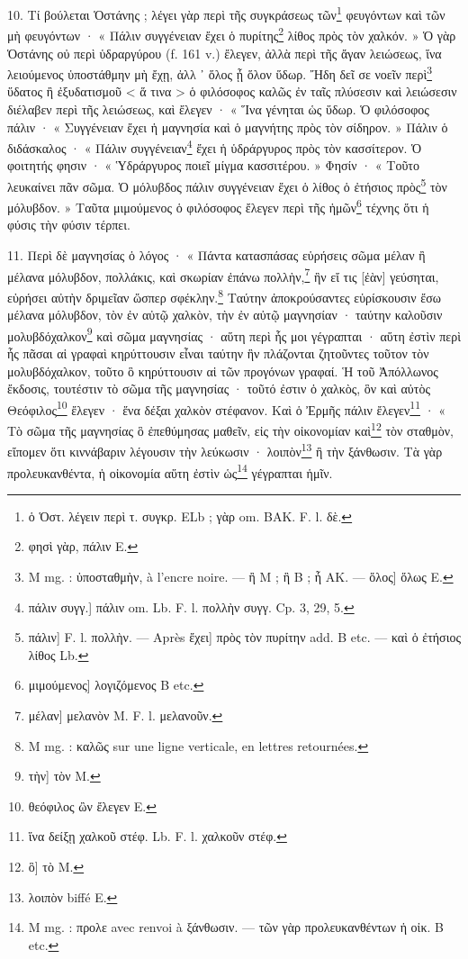 \documentclass[a4paper, 11pt, oneside, polutonikogreek, french]{article}
\begin{document}
10. Τί βούλεται Ὁστάνης ; λέγει γὰρ περὶ τῆς συγκράσεως τῶν\footnote{ὁ Ὁστ. λέγειν περὶ τ. συγκρ. ELb ; γὰρ om. BAK. F. l. δὲ.} φευγόντων καὶ τῶν μὴ φευγόντων · « Πάλιν συγγένειαν ἔχει ὁ πυρίτης\footnote{φησὶ γὰρ, πάλιν E.} λίθος πρὸς τὸν χαλκόν. » Ὁ γὰρ Ὁστάνης οὐ περὶ ὑδραργύρου (f. 161 v.) ἔλεγεν, ἀλλὰ περὶ τῆς ἄγαν λειώσεως, ἵνα λειούμενος ὑποστάθμην μὴ ἔχῃ, ἀλλ ᾽ ὅλος ᾖ ὅλον ὕδωρ. Ἤδη δεῖ σε νοεῖν περὶ\footnote{M mg. : ὑποσταθμὴν, à l'encre noire. --- ἢ M ; ἣ B ; ἦ AK. --- ὅλος] ὅλως E.} ὕδατος ἢ ἐξυδατισμοῦ < ἅ τινα > ὁ φιλόσοφος καλῶς ἐν ταῖς πλύσεσιν καὶ λειώσεσιν διέλαβεν περὶ τῆς λειώσεως, καὶ ἔλεγεν · « Ἵνα γένηται ὡς ὕδωρ. Ὁ φιλόσοφος πάλιν · « Συγγένειαν ἔχει ἡ μαγνησία καὶ ὁ μαγνήτης πρὸς τὸν σίδηρον. » Πάλιν ὁ διδάσκαλος · « Πάλιν συγγένειαν\footnote{πάλιν συγγ.] πάλιν om. Lb. F. l. πολλὴν συγγ. Cp. 3, 29, 5.} ἔχει ἡ ὑδράργυρος πρὸς τὸν κασσίτερον. Ὁ φοιτητής φησιν · « Ὑδράργυρος ποιεῖ μίγμα κασσιτέρου. » Φησίν · « Τοῦτο λευκαίνει πᾶν σῶμα. Ὁ μόλυβδος πάλιν συγγένειαν ἔχει ὁ λίθος ὁ ἐτήσιος πρὸς\footnote{πάλιν] F. l. πολλὴν. --- Après ἔχει] πρὸς τὸν πυρίτην add. B etc. --- καὶ ὁ ἐτήσιος λίθος Lb.} τὸν μόλυβδον. » Ταῦτα μιμούμενος ὁ φιλόσοφος ἔλεγεν περὶ τῆς ἡμῶν\footnote{μιμούμενος] λογιζόμενος B etc.} τέχνης ὅτι ἡ φύσις τὴν φύσιν τέρπει.

11. Περὶ δὲ μαγνησίας ὁ λόγος · « Πάντα κατασπάσας εὑρήσεις σῶμα μέλαν ἢ μέλανα μόλυβδον, πολλάκις, καὶ σκωρίαν ἐπάνω πολλὴν,\footnote{μέλαν] μελανὸν M. F. l. μελανοῦν.} ἣν εἴ τις [ἐὰν] γεύσηται, εὑρήσει αὐτὴν δριμεῖαν ὥσπερ σφέκλην.\footnote{M mg. : καλῶς sur une ligne verticale, en lettres retournées.} Ταύτην ἀποκρούσαντες εὑρίσκουσιν ἔσω μέλανα μόλυβδον, τὸν ἐν αὐτῷ χαλκὸν, τὴν ἐν αὐτῷ μαγνησίαν · ταύτην καλοῦσιν μολυβδόχαλκον\footnote{τὴν] τὸν M.} καὶ σῶμα μαγνησίας · αὕτη περὶ ἧς μοι γέγραπται · αὕτη ἐστὶν περὶ ἧς πᾶσαι αἱ γραφαὶ κηρύττουσιν εἶναι ταύτην ἣν πλάζονται ζητοῦντες τοῦτον τὸν μολυβδόχαλκον, τοῦτο ὃ κηρύττουσιν αἱ τῶν προγόνων γραφαί. Ἡ τοῦ Ἀπόλλωνος ἔκδοσις, τουτέστιν τὸ σῶμα τῆς μαγνησίας · τοῦτό ἐστιν ὁ χαλκὸς, ὃν καὶ αὐτὸς Θεόφιλος\footnote{θεόφιλος ὢν ἔλεγεν E.} ἔλεγεν · ἕνα δέξαι χαλκὸν στέφανον. Καὶ ὁ Ἐρμῆς πάλιν ἔλεγεν\footnote{ἵνα δείξῃ χαλκοῦ στέφ. Lb. F. l. χαλκοῦν στέφ.} · « Τὸ σῶμα τῆς μαγνησίας ὃ ἐπεθύμησας μαθεῖν, εἰς τὴν οἰκονομίαν καὶ\footnote{ὃ] τὸ M.} τὸν σταθμὸν, εἴπομεν ὅτι κιννάβαριν λέγουσιν τὴν λεύκωσιν · λοιπὸν\footnote{λοιπὸν biffé E.} ἢ τὴν ξάνθωσιν. Τὰ γὰρ προλευκανθέντα, ἡ οἰκονομία αὕτη ἐστὶν ὡς\footnote{M mg. : προλε avec renvoi à ξάνθωσιν. --- τῶν γὰρ προλευκανθέντων ἡ οἰκ. B etc.} γέγραπται ἡμῖν.
\end{document}
